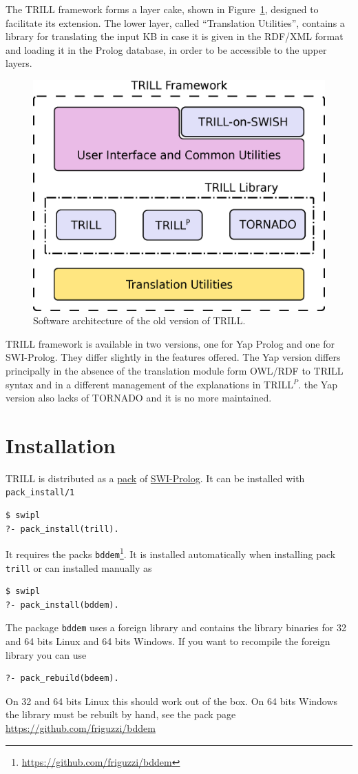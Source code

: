 \documentclass[a4paper,10pt]{scrartcl}
\begin{document}
The TRILL framework forms a layer cake, shown in Figure~\ref{fig:trill_arch}, designed to facilitate its extension. The lower layer, called ``Translation Utilities'', contains a library for translating the input KB in case it is given in the RDF/XML format and loading it in the Prolog database, in order to be accessible to the upper layers.
\begin{figure}
	\centering
	\includegraphics[width=0.5\linewidth]{img/trill-architecture}
	\caption{Software architecture of the old version of TRILL.}
	\label{fig:trill_arch}
\end{figure}

TRILL framework is available in two versions, one for Yap Prolog and one for SWI-Prolog. They differ slightly in the features offered.
The Yap version differs principally in the absence of the translation module form OWL/RDF to TRILL syntax and in a different management of the explanations in TRILL$^P$. the Yap version also lacks of TORNADO and it is no more maintained.

\section{Installation}
TRILL is distributed as a \href{http://www.swi-prolog.org/pack/list?p=trill}{pack} of \href{http://www.swi-prolog.org/}{SWI-Prolog}.
It can be installed with \verb|pack_install/1|
\begin{verbatim}
$ swipl
?- pack_install(trill).
\end{verbatim}

It requires the packs \verb|bddem|\footnote{\url{https://github.com/friguzzi/bddem}}. It is installed automatically when installing pack \verb|trill| or can installed manually as
\begin{verbatim}
$ swipl
?- pack_install(bddem).
\end{verbatim}
The package \verb|bddem| uses a foreign library and contains the library binaries for 32 and 64 bits Linux and 64 bits Windows. If you want to recompile the foreign library you can use
\begin{verbatim}
?- pack_rebuild(bdeem).
\end{verbatim}
On 32 and 64 bits Linux this should work out of the box. On 64 bits Windows the library must be rebuilt by hand, see the pack page \url{https://github.com/friguzzi/bddem}
\end{document}
